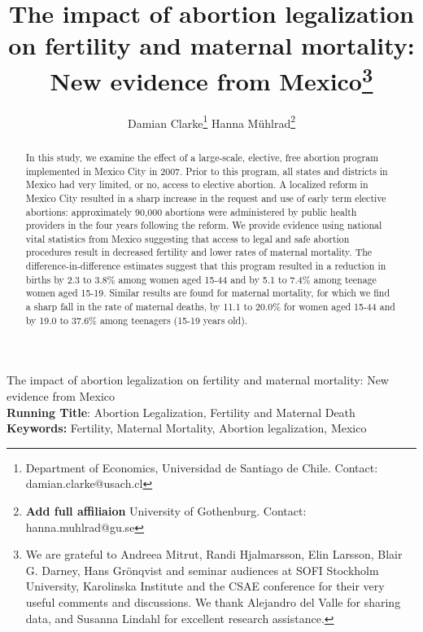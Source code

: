 \documentclass[a4paper, 11pt]{article}
\title{The impact of abortion legalization on fertility and maternal mortality: New evidence from Mexico\thanks{We are grateful to Andreea Mitrut, Randi Hjalmarsson, Elin Larsson, Blair G. Darney, Hans Gr\"onqvist and seminar audiences at SOFI Stockholm University, Karolinska Institute and the CSAE conference for their very useful comments and discussions.  We thank Alejandro del Valle for sharing data, and Susanna Lindahl for excellent research assistance.}}
\author{Damian Clarke\thanks{Department of Economics, Universidad de Santiago de Chile.  Contact: damian.clarke@usach.cl} \hspace{1cm} Hanna Mühlrad\thanks{\textbf{Add full affiliaion} University of Gothenburg. Contact: hanna.muhlrad@gu.se}}
\begin{document}
\maketitle
\newpage
{}

\begin{spacing}{2}
\begin{center}
  {\Large The impact of abortion legalization on fertility and maternal mortality: New evidence from Mexico}
  \\
\vspace{5mm}
  \textbf{Running Title}: Abortion Legalization, Fertility and Maternal Death \\
\textbf{Keywords:} Fertility, Maternal Mortality, Abortion legalization, Mexico

\end{center}

\newpage

\begin{abstract}
\noindent In this study, we examine the effect of a large-scale, elective, free abortion program implemented in Mexico City in 2007. Prior to this program, all states and districts in Mexico had very limited, or no, access to elective abortion. A localized reform in Mexico City resulted in a sharp increase in the request and use of early term elective abortions: approximately 90,000 abortions were administered by public health providers in the four years following the reform. We provide evidence using national vital statistics from Mexico suggesting that access to legal and safe abortion procedures result in decreased fertility and lower rates of maternal mortality. The difference-in-difference estimates suggest that this program resulted in a reduction in births by 2.3 to 3.8\% among women aged 15-44 and by 5.1 to 7.4\% among teenage women aged 15-19. Similar results are found for maternal mortality, for which we find a sharp fall in the rate of maternal deaths, by 11.1 to 20.0\% for women aged 15-44 and by 19.0 to 37.6\% among teenagers (15-19 years old).  
\end{abstract}



\newpage 

\end{spacing}
\end{document}
